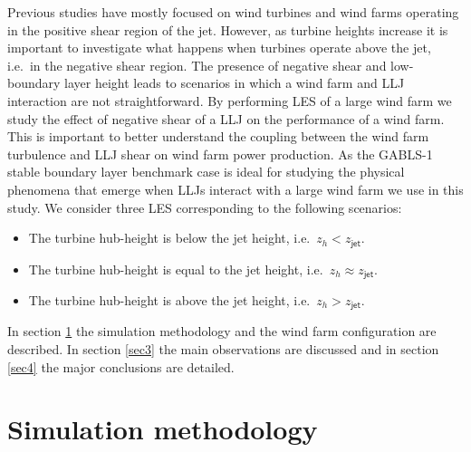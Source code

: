 \documentclass[%
 aip,
 amsmath,amssymb,
preprint,%
author-numerical,%
]{revtex4-1}
\begin{document}
Previous studies have mostly focused on wind turbines and wind farms operating in the positive shear region of the jet. However, as turbine heights increase it is important to investigate what happens when turbines operate above the jet, i.e.\ in the negative shear region. The presence of negative shear and low-boundary layer height leads to scenarios in which a wind farm and LLJ interaction are not straightforward. By performing LES of a large wind farm we study the effect of negative shear of a LLJ on the performance of a wind farm. This is important to better understand the coupling between the wind farm turbulence and LLJ shear on wind farm power production. As the GABLS-1 stable boundary layer benchmark case is ideal for studying the physical phenomena that emerge when LLJs interact with a large wind farm we use in this study. We consider three LES corresponding to the following scenarios:
\vspace{-2.5mm}
\begin{itemize}
\item[1.] The turbine hub-height is below the jet height, i.e.\ $z_h < z_\mathsf{jet}$.
\vspace{-2.5mm}
\item[2.] The turbine hub-height is equal to the jet height, i.e.\ $z_h \approx z_\mathsf{jet}$.
\vspace{-2.5mm}
\item[3.] The turbine hub-height is above the jet height, i.e.\ $z_h > z_\mathsf{jet}$.
\end{itemize}
In section \ref{sec2} the simulation methodology and the wind farm configuration are described. In section \ref{sec3} the main observations are discussed and in section \ref{sec4} the major conclusions are detailed. 

\section{Simulation methodology}\label{sec2}
\end{document}
